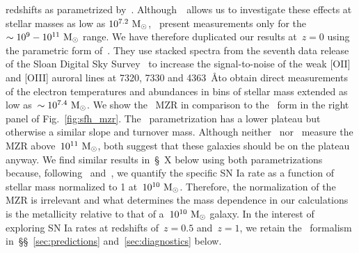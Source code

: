 \documentclass[ms.tex]{subfiles}
\begin{document}
redshifts as parametrized by~\citet[][see their equation 5]{Zahid2014}.
Although~\um~allows us to investigate these effects at stellar masses as low as
$10^{7.2}~\text{M}_\odot$,~\citet{Zahid2014} present measurements only for the
$\sim10^9 - 10^{11}~\text{M}_\odot$ range.
We have therefore duplicated our results at~$z = 0$ using the parametric form
of~\citet{Andrews2013}.
They use stacked spectra from the seventh data release of the Sloan Digital
Sky Survey~\citep[SDSS;][]{York2000, Abazajian2009, Abdorrouf2022} to increase
the signal-to-noise of the weak [OII] and [OIII] auroral lines at 7320, 7330
and 4363~\AA to obtain direct measurements of the electron temperatures and
abundances in bins of stellar mass extended as low as~$\sim 10^{7.4}~\text{M}_\odot$.
We show the~\citet{Andrews2013} MZR in comparison to the~\citet{Zahid2014} form
in the right panel of Fig.~\ref{fig:sfh_mzr}.
The~\citet{Andrews2013} parametrization has a lower plateau but otherwise a
similar slope and turnover mass.
Although neither~\citet{Andrews2013} nor~\citet{Zahid2014} measure the MZR
above~$10^{11}~\text{M}_\odot$, both suggest that these galaxies should be on the
plateau anyway.
We find similar results in~\S~X below using both parametrizations because,
following~\citet{Brown2019} and~\citet{Gandhi2022}, we quantify the specific
SN Ia rate as a function of stellar mass normalized to 1 at~$10^{10}~\text{M}_\odot$.
Therefore, the normalization of the MZR is irrelevant and what determines the
mass dependence in our calculations is the metallicity relative to that of
a~$10^{10}~\text{M}_\odot$ galaxy.
In the interest of exploring SN Ia rates at redshifts of~$z = 0.5$ and~$z = 1$,
we retain the~\citet{Zahid2014} formalism in~\S\S~\ref{sec:predictions}
and~\ref{sec:diagnostics} below.
\end{document}
